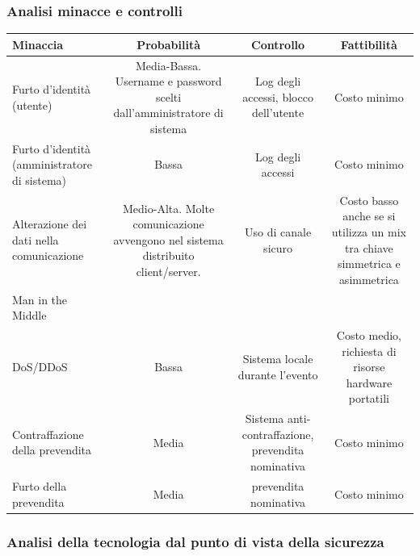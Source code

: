 \documentclass[a4paper]{article}
\begin{document}
\subsubsection{Analisi minacce e controlli}


\begin{center}
    \begin{tabulary}{1\textwidth}{|L|C|C|C|}
        \hline
        \textbf{Minaccia} & \textbf{Probabilità} & \textbf{Controllo} & \textbf{Fattibilità}  \\
        \hline
        \hline
        Furto d’identità (utente) & Media-Bassa. Username e password scelti dall'amministratore di sistema & Log degli accessi, blocco dell'utente & Costo minimo\\
        \hline
        Furto d’identità (amministratore di sistema) & Bassa & Log degli accessi & Costo minimo\\
        \hline
        Alterazione dei dati nella comunicazione & Medio-Alta. Molte comunicazione avvengono nel sistema distribuito client/server. & Uso di canale sicuro & Costo basso anche se si utilizza un mix tra chiave simmetrica e asimmetrica\\
        Man in the Middle &  &  & \\
        \hline
        DoS/DDoS & Bassa & Sistema locale durante l'evento & Costo medio, richiesta di risorse hardware portatili\\
        \hline
        Contraffazione della prevendita & Media & Sistema anti-contraffazione, prevendita nominativa & Costo minimo\\
        \hline
        Furto della prevendita & Media & prevendita nominativa & Costo minimo\\
        \hline
    \end{tabulary}
\end{center}

\newpage

\subsubsection{Analisi della tecnologia dal punto di vista della sicurezza}
\end{document}
